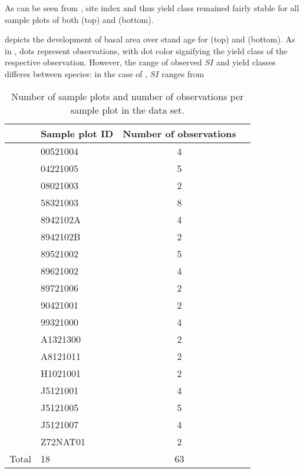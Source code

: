As can be seen from , site index and thus yield class remained fairly stable for all sample plots of both \Beech{} (top) and \Spruce{} (bottom).


 depicts the development of basal area over stand age for \Beech{} (top) and \Spruce{} (bottom).  As in , dots represent observations, with dot color signifying the yield class of the respective observation.  However, the range of observed \(SI\) and yield classes differes between species: in the case of \Beech{}, \(SI\) ranges from %

\newpage{}  %
\begin{singlespace}
  {\tabulinesep=2mm
    \begin{longtabu}{l l S L}
      \caption{Number of sample plots and number of observations per sample plot in the \Beech{} data set. \label{tab:ObservationsCountPerEdvidBeech}} \\
      \toprule
      & Sample plot ID & {Number of observations} &  \\
      \midrule
      \endhead
      \bottomrule
      \endlastfoot
      & 00521004 & 4 \\
      & 04221005 & 5 \\
      & 08021003 & 2 \\
      & 58321003 & 8 \\
      & 8942102A & 4 \\
      & 8942102B & 2 \\
      & 89521002 & 5 \\
      & 89621002 & 4 \\
      & 89721006 & 2 \\
      & 90421001 & 2 \\
      & 99321000 & 4 \\
      & A1321300 & 2 \\
      & A8121011 & 2 \\
      & H1021001 & 2 \\
      & J5121001 & 4 \\
      & J5121005 & 5 \\
      & J5121007 & 4 \\
      & Z72NAT01 & 2 \\
      Total & 18 & 63 \\
    \end{longtabu}
  }
\end{singlespace}

